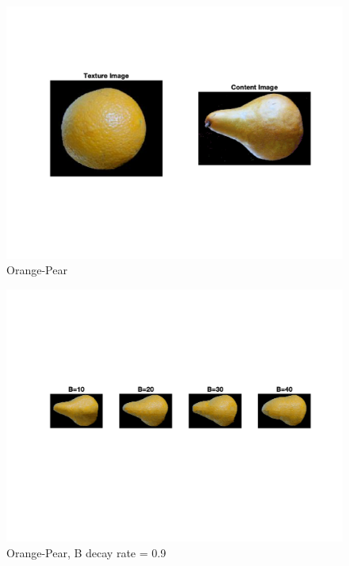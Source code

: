\documentclass[10pt,twocolumn,letterpaper]{article}
\begin{document}
\begin{figure}[h]
    \begin{center}
    \includegraphics[trim={2cm 4cm 2cm 2cm}, clip, scale=0.5]{../results/bsize/inp_orange_pear.png}
    \end{center}
    \vspace{-0.2em}
    \caption{Orange-Pear}
    \label{fig:or_pear}
\end{figure}

\begin{figure}[h]
    \begin{center}
    \includegraphics[trim={2cm 6cm 2cm 4cm}, clip, scale=0.9]{../results/bsize/res_orange_pear_bdr_0_900000_iter_5.png}
    \end{center}
    \vspace{-0.2em}
    \caption{Orange-Pear, B decay rate = 0.9}
    \label{fig:orange_pear_bs}
\end{figure}
\end{document}
